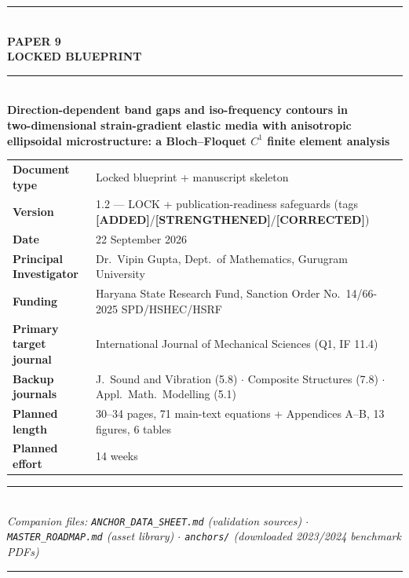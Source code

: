 \documentclass[11pt,a4paper]{article}
\newcommand{\ADDED}{{\color{addcol}\textbf{[ADDED]}}}
\newcommand{\STR}{{\color{strcol}\textbf{[STRENGTHENED]}}}
\newcommand{\COR}{{\color{corcol}\textbf{[CORRECTED]}}}
\begin{document}
\begin{titlepage}
\centering
\vspace*{0.6cm}
{\color{accent}\rule{\textwidth}{1.2pt}}\\[0.5cm]
{\Huge\bfseries\color{lockblue} PAPER 9}\\[0.35cm]
{\Large\bfseries LOCKED BLUEPRINT}\\[0.9cm]
{\color{accent}\rule{\textwidth}{0.6pt}}\\[1.1cm]

{\large\bfseries Direction-dependent band gaps and iso-frequency contours in\\[0.25cm]
two-dimensional strain-gradient elastic media with anisotropic\\[0.25cm]
ellipsoidal microstructure: a Bloch--Floquet $C^1$ finite element analysis}\\[1.3cm]

\begin{minipage}{0.86\textwidth}
\centering\footnotesize
\begin{tabular}{@{}>{\bfseries}p{3.5cm} p{9.6cm}@{}}
\textbf{Document type} & Locked blueprint + manuscript skeleton \\
\textbf{Version} & 1.2 --- LOCK + publication-readiness safeguards (tags \ADDED/\STR/\COR) \\
\textbf{Date} & 22 September 2026 \\
\textbf{Principal Investigator} & Dr.\ Vipin Gupta, Dept.\ of Mathematics, Gurugram University \\
\textbf{Funding} & Haryana State Research Fund, Sanction Order No.\ 14/66-2025 SPD/HSHEC/HSRF \\
\textbf{Primary target journal} & International Journal of Mechanical Sciences (Q1, IF 11.4) \\
\textbf{Backup journals} & J.\ Sound and Vibration (5.8) $\cdot$ Composite Structures (7.8) $\cdot$ Appl.\ Math.\ Modelling (5.1) \\
\textbf{Planned length} & 30--34 pages, 71 main-text equations + Appendices A--B, 13 figures, 6 tables \\
\textbf{Planned effort} & 14 weeks \\
\end{tabular}
\end{minipage}

\vfill
{\color{accent}\rule{\textwidth}{0.6pt}}\\[0.35cm]
{\footnotesize\itshape Companion files: \texttt{ANCHOR\_DATA\_SHEET.md} (validation sources) $\cdot$
\texttt{MASTER\_ROADMAP.md} (asset library) $\cdot$
\texttt{anchors/} (downloaded 2023/2024 benchmark PDFs)}\\[0.3cm]
{\color{accent}\rule{\textwidth}{1.2pt}}
\end{titlepage}
\end{document}
